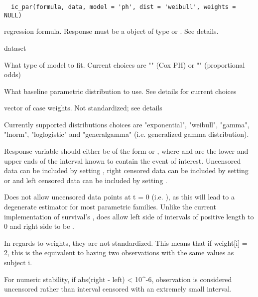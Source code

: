 \documentclass[a4paper]{book}
\begin{document}
%
\begin{Usage}
\begin{verbatim}
  ic_par(formula, data, model = 'ph', dist = 'weibull', weights = NULL) 
\end{verbatim}
\end{Usage}
%
\begin{Arguments}
\begin{ldescription}
\item[\code{formula}] regression formula. Response must be a  object of type  or . See details.
\item[\code{data}] dataset
\item[\code{model}] What type of model to fit. Current choices are "" (Cox PH) or "" (proportional odds)
\item[\code{dist}] What baseline parametric distribution to use. See details for current choices
\item[\code{weights}] vector of case weights. Not standardized; see details
\end{ldescription}
\end{Arguments}
%
\begin{Details}\relax
Currently supported distributions choices are "exponential", "weibull", "gamma", "lnorm", "loglogistic" and "generalgamma" (i.e. generalized gamma distribution). 

Response variable should either be of the form  or , where  and  are the lower and upper ends of the interval known to contain the event of interest. Uncensored data can be included by setting , right censored data can be included by setting  or  and left censored data can be included by setting .

Does not allow uncensored data points at t = 0 (i.e. ), as this will lead to a degenerate estimator for most parametric families. Unlike the current implementation of survival's , does allow left side of intervals of positive length to 0 and right side to be . 

In regards to weights, they are not standardized. This means that if weight[i] = 2, this is the equivalent to having two observations with the same values as subject i. 

For numeric stability, if abs(right - left) < 10\textasciicircum{}-6, observation is considered uncensored rather than interval censored with an extremely small interval. 
\end{Details}
\end{document}
